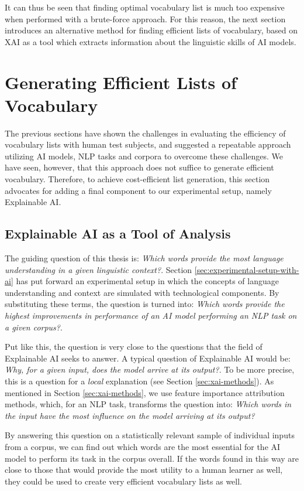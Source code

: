 It can thus be seen that finding optimal vocabulary list is much too expensive when performed with a brute-force approach.
For this reason, the next section introduces an alternative method for finding efficient lists of vocabulary, based on XAI as a tool which extracts information about the linguistic skills of AI models.

\section{Generating Efficient Lists of Vocabulary} \label{sec:list-generation}

The previous sections have shown the challenges in evaluating the efficiency of vocabulary lists with human test subjects, and suggested a repeatable approach utilizing AI models, NLP tasks and corpora to overcome these challenges.
We have seen, however, that this approach does not suffice to generate efficient vocabulary.
Therefore, to achieve cost-efficient list generation, this section advocates for adding a final component to our experimental setup, namely Explainable AI.

\subsection{Explainable AI as a Tool of Analysis} \label{sec:xai-as-tools-of-analysis}
The guiding question of this thesis is:
\textit{Which words provide the most language understanding in a given linguistic context?}.
Section \ref{sec:experimental-setup-with-ai} has put forward an experimental setup in which the concepts of language understanding and context are simulated with technological components.
By substituting these terms, the question is turned into:
\textit{Which words provide the highest improvements in performance of an AI model performing an NLP task on a given corpus?}.

Put like this, the question is very close to the questions that the field of Explainable AI seeks to answer.
A typical question of Explainable AI would be:
\textit{Why, for a given input, does the model arrive at its output?}. 
To be more precise, this is a question for a \textit{local} explanation (see Section \ref{sec:xai-methods}).
As mentioned in Section \ref{sec:xai-methods}, we use feature importance attribution methods, which, for an NLP task, transforms the question into:
\textit{Which words in the input have the most influence on the model arriving at its output?}

By answering this question on a statistically relevant sample of individual inputs from a corpus, we can find out which words are the most essential for the AI model to perform its task in the corpus overall.
If the words found in this way are close to those that would provide the most utility to a human learner as well, they could be used to create very efficient vocabulary lists as well.

